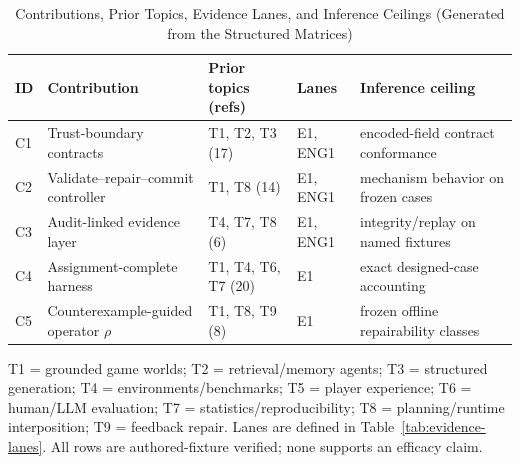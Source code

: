 \begin{table}[t]
\caption{Contributions, Prior Topics, Evidence Lanes, and Inference Ceilings (Generated from the Structured Matrices)}
\label{tab:contribution-map}
\centering\scriptsize
\setlength{\tabcolsep}{4pt}
\renewcommand{\arraystretch}{1.20}

\begin{tabularx}{\columnwidth}{@{}l>{\raggedright\arraybackslash}X>{\raggedright\arraybackslash}p{}l>{\raggedright\arraybackslash}p{}@{}}
\toprule
\textbf{ID} & \textbf{Contribution} & \textbf{Prior topics (refs)} & \textbf{Lanes} & \textbf{Inference ceiling} \\
\midrule
C1 & Trust-boundary contracts & T1, T2, T3 (17) & E1, ENG1 & encoded-field contract conformance \\
C2 & Validate--repair--commit controller & T1, T8 (14) & E1, ENG1 & mechanism behavior on frozen cases \\
C3 & Audit-linked evidence layer & T4, T7, T8 (6) & E1, ENG1 & integrity/replay on named fixtures \\
C4 & Assignment-complete harness & T1, T4, T6, T7 (20) & E1 & exact designed-case accounting \\
C5 & Counterexample-guided operator $\rho$ & T1, T8, T9 (8) & E1 & frozen offline repairability classes \\
\bottomrule
\end{tabularx}
\par\vspace{3pt}\noindent\parbox{0.96\columnwidth}{\scriptsize T1 = grounded game worlds; T2 = retrieval/memory agents; T3 = structured generation; T4 = environments/benchmarks; T5 = player experience; T6 = human/LLM evaluation; T7 = statistics/reproducibility; T8 = planning/runtime interposition; T9 = feedback repair. Lanes are defined in Table~\ref{tab:evidence-lanes}. All rows are authored-fixture verified; none supports an efficacy claim.}
\end{table}
